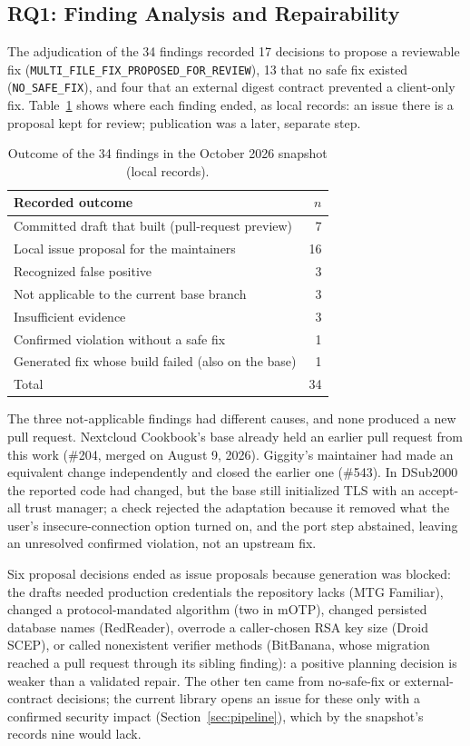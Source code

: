 \documentclass[conference]{IEEEtran}
\newcommand{\researchq}[1]{\textbf{RQ#1}}
\begin{document}
\subsection{\researchq{1}: Finding Analysis and Repairability}
\label{subsec:rq1}

The adjudication of the 34 findings recorded 17 decisions to propose a
reviewable fix (\texttt{MULTI\_FILE\_FIX\_PROPOSED\_FOR\_REVIEW}), 13 that no
safe fix existed (\texttt{NO\_SAFE\_FIX}), and four that an external digest
contract prevented a client-only fix. Table~\ref{tab:adjudication} shows
where each finding ended, as local records: an issue there is a proposal kept
for review; publication was a later, separate step.

\begin{table}[H]
\centering
\caption{Outcome of the 34 findings in the October 2026 snapshot (local
records).}
\label{tab:adjudication}
\footnotesize
\begin{tabular}{p{6.1cm}r}
\toprule
Recorded outcome & $n$ \\
\midrule
Committed draft that built (pull-request preview) & 7 \\
Local issue proposal for the maintainers & 16 \\
Recognized false positive & 3 \\
Not applicable to the current base branch & 3 \\
Insufficient evidence & 3 \\
Confirmed violation without a safe fix & 1 \\
Generated fix whose build failed (also on the base) & 1 \\
\midrule
Total & 34 \\
\bottomrule
\end{tabular}
\end{table}

The three not-applicable findings had different causes, and none produced a
new pull request. Nextcloud Cookbook's base already held an earlier pull
request from this work (\#204, merged on August 9, 2026). Giggity's
maintainer had made an equivalent change independently and closed the earlier
one (\#543). In DSub2000 the reported code had changed, but the base still
initialized TLS with an accept-all trust manager; a check rejected the
adaptation because it removed what the user's insecure-connection option
turned on, and the port step abstained, leaving an unresolved confirmed
violation, not an upstream fix.

Six proposal decisions ended as issue proposals because generation was
blocked: the drafts needed production credentials the repository lacks (MTG
Familiar), changed a protocol-mandated algorithm (two in mOTP), changed
persisted database names (RedReader), overrode a caller-chosen RSA key size
(Droid SCEP), or called nonexistent verifier methods (BitBanana, whose
migration reached a pull request through its sibling finding): a positive
planning decision is weaker than a validated repair. The other ten came from
no-safe-fix or external-contract decisions; the current library opens an
issue for these only with a confirmed security impact
(Section~\ref{sec:pipeline}), which by the snapshot's records nine would lack.
\end{document}
